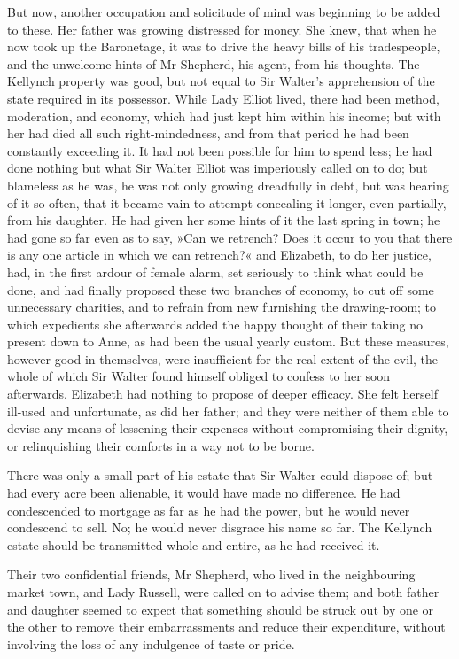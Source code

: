 But now, another occupation and solicitude of mind was beginning to be added to these. Her father was growing distressed for money. She knew, that when he now took up the Baronetage, it was to drive the heavy bills of his tradespeople, and the unwelcome hints of Mr Shepherd, his agent, from his thoughts. The Kellynch property was good, but not equal to Sir Walter's apprehension of the state required in its possessor. While Lady Elliot lived, there had been method, moderation, and economy, which had just kept him within his income; but with her had died all such right-mindedness, and from that period he had been constantly exceeding it. It had not been possible for him to spend less; he had done nothing but what Sir Walter Elliot was imperiously called on to do; but blameless as he was, he was not only growing dreadfully in debt, but was hearing of it so often, that it became vain to attempt concealing it longer, even partially, from his daughter. He had given her some hints of it the last spring in town; he had gone so far even as to say, »Can we retrench? Does it occur to you that there is any one article in which we can retrench?« and Elizabeth, to do her justice, had, in the first ardour of female alarm, set seriously to think what could be done, and had finally proposed these two branches of economy, to cut off some unnecessary charities, and to refrain from new furnishing the drawing-room; to which expedients she afterwards added the happy thought of their taking no present down to Anne, as had been the usual yearly custom. But these measures, however good in themselves, were insufficient for the real extent of the evil, the whole of which Sir Walter found himself obliged to confess to her soon afterwards. Elizabeth had nothing to propose of deeper efficacy. She felt herself ill-used and unfortunate, as did her father; and they were neither of them able to devise any means of lessening their expenses without compromising their dignity, or relinquishing their comforts in a way not to be borne.

There was only a small part of his estate that Sir Walter could dispose of; but had every acre been alienable, it would have made no difference. He had condescended to mortgage as far as he had the power, but he would never condescend to sell. No; he would never disgrace his name so far. The Kellynch estate should be transmitted whole and entire, as he had received it.

Their two confidential friends, Mr Shepherd, who lived in the neighbouring market town, and Lady Russell, were called on to advise them; and both father and daughter seemed to expect that something should be struck out by one or the other to remove their embarrassments and reduce their expenditure, without involving the loss of any indulgence of taste or pride.